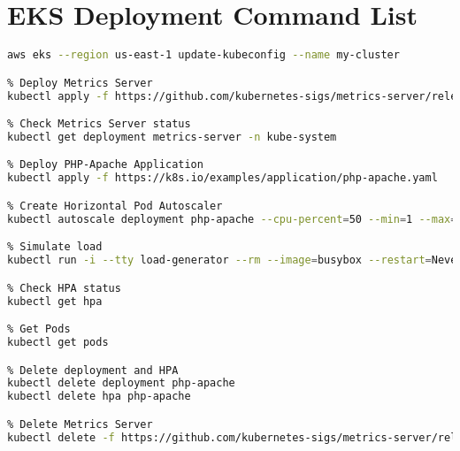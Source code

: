 \section{EKS Deployment Command List} \label{appendix:deploy_eks}

\begin{lstlisting}[language=bash]
% Update kubeconfig for EKS cluster
aws eks --region us-east-1 update-kubeconfig --name my-cluster

% Deploy Metrics Server
kubectl apply -f https://github.com/kubernetes-sigs/metrics-server/releases/latest/download/components.yaml

% Check Metrics Server status
kubectl get deployment metrics-server -n kube-system

% Deploy PHP-Apache Application
kubectl apply -f https://k8s.io/examples/application/php-apache.yaml

% Create Horizontal Pod Autoscaler
kubectl autoscale deployment php-apache --cpu-percent=50 --min=1 --max=10

% Simulate load
kubectl run -i --tty load-generator --rm --image=busybox --restart=Never -- /bin/sh -c "while sleep 0.01; do wget -q -O- http://php-apache; done"

% Check HPA status
kubectl get hpa

% Get Pods
kubectl get pods

% Delete deployment and HPA
kubectl delete deployment php-apache
kubectl delete hpa php-apache

% Delete Metrics Server
kubectl delete -f https://github.com/kubernetes-sigs/metrics-server/releases/latest/download/components.yaml
\end{lstlisting}